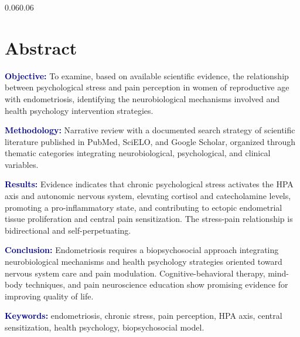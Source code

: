 \documentclass[12pt, a4paper]{article}
\newcommand{\kw}[1]{\textbf{\textcolor{darkblue}{#1}}}
\begin{document}
\begin{adjustwidth}{0.06\textwidth}{0.06\textwidth}
\vspace{1.5em}

\section*{Abstract}

\begin{mdframed}[style=resumen]
\noindent
\kw{Objective:} To examine, based on available scientific evidence, the relationship
between psychological stress and pain perception in women of reproductive age with
endometriosis, identifying the neurobiological mechanisms involved and health psychology
intervention strategies.

\vspace{0.5em}
\kw{Methodology:} Narrative review with a documented search strategy of scientific
literature published in PubMed, SciELO, and Google Scholar, organized through thematic
categories integrating neurobiological, psychological, and clinical variables.

\vspace{0.5em}
\kw{Results:} Evidence indicates that chronic psychological stress activates the HPA axis
and autonomic nervous system, elevating cortisol and catecholamine levels, promoting a
pro-inflammatory state, and contributing to ectopic endometrial tissue proliferation and
central pain sensitization. The stress-pain relationship is bidirectional and
self-perpetuating.

\vspace{0.5em}
\kw{Conclusion:} Endometriosis requires a biopsychosocial approach integrating
neurobiological mechanisms and health psychology strategies oriented toward nervous system
care and pain modulation. Cognitive-behavioral therapy, mind-body techniques, and pain
neuroscience education show promising evidence for improving quality of life.

\vspace{0.8em}
\noindent\kw{Keywords:} endometriosis, chronic stress, pain perception, HPA axis,
central sensitization, health psychology, biopsychosocial model.
\end{mdframed}

\end{adjustwidth}

\vspace{1.5em}

\pagestyle{fancy}
\end{document}
